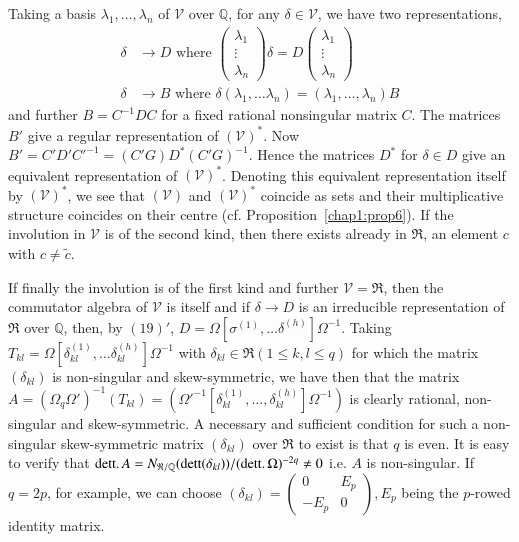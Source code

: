 Taking a basis $\lambda_1,\ldots, \lambda_n$ of $\mathscr{V}$ over
$\mathbb{Q}$, for any $\delta\in \mathscr{V}$, we have two
representations,
\begin{align*}
\delta & \rightarrow D \text{ where }
\left(\begin{smallmatrix} \lambda_1
  \\ \vdots\\\lambda_n\end{smallmatrix}\right) \delta = D
 \left(\begin{smallmatrix} \lambda_1
   \\ \vdots\\ \lambda_{n}\end{smallmatrix}\right) \\
\delta & \rightarrow B \text{ where } \delta (\lambda_1,\ldots
\lambda_n) = (\lambda_1,\ldots, \lambda_n) B
\end{align*}
and further $B =C^{-1}DC$ for a fixed rational nonsingular matrix
$C$. The matrices $B'$ give a regular representation of
$(\mathscr{V})^{\ast}$. Now $B' = C' D' C'^{-1} = (C'G)D^{\ast} (C'
G)^{-1}$. Hence the matrices $D^{\ast}$ for $\delta \in D$ give an
equivalent representation of $(\mathscr{V})^{\ast}$. Denoting this
equivalent representation itself by $(\mathscr{V})^{\ast}$, we see
that $(\mathscr{V})$ and $(\mathscr{V})^{\ast}$ coincide as sets and
their multiplicative structure coincides on their centre
(cf. Proposition~\ref{chap1:prop6}). If the involution in $\mathscr{V}$ is of the
second kind, then there exists already in $\mathfrak{R}$, an element
$c$ with $c\neq \widetilde{c}$. 

If finally the involution is of the first kind and further
$\mathscr{V} = \mathfrak{R}$, then the commutator algebra of
$\mathscr{V}$ is itself and if $\delta \rightarrow D$ is an
irreducible representation of $\mathfrak{R}$ over $\mathbb{Q}$, then,
by $(19)'$, $D= \Omega[\sigma^{(1)},\ldots
  \delta^{(h)}]\Omega^{-1}$. Taking $T_{kl} = \Omega
[\delta^{(1)}_{kl},\ldots \delta^{(h)}_{kl}]\Omega^{-1}$ with
$\delta_{kl} \in \mathfrak{R} (1\leq k, l \leq q)$ for which the
matrix $(\delta_{kl})$ is non-singular and skew-symmetric, we have
then that the matrix $A=(\Omega_q \Omega')^{-1}(T_{kl}) =
(\Omega'^{-1} [\delta^{(1)}_{kl},\ldots,
  \delta^{(h)}_{kl}]\Omega^{-1})$ \pageoriginale is clearly rational,
non-singular and skew-symmetric. A necessary and sufficient condition
for such a non-singular skew-symmetric matrix $(\delta_{kl})$ over
$\mathfrak{R}$ to exist is that $q$ is even. It is easy to verify that
$\text{dett}\ldotp A=N_{\mathfrak{R}/\mathbb{Q}}
(\text{dett}(\delta_{kl}))/ (\text{dett}\ldotp\Omega)^{-2q}\neq 0$
i.e. $A$ is non-singular. If $q=2p$, for example, we can choose
$(\delta_{kl}) =
\left(\begin{smallmatrix} 0 & E_p \\ -E_p & 0\end{smallmatrix}\right),
  E_p $ being the $p$-rowed identity matrix. 

